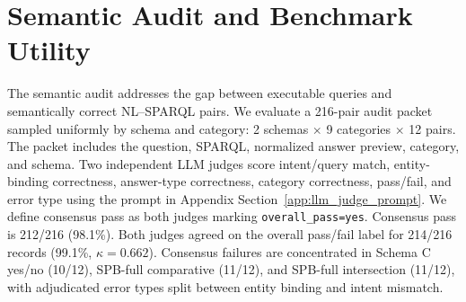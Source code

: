 \documentclass[11pt]{article}
\begin{document}
\section{Semantic Audit and Benchmark Utility}
\label{sec:audit_utility}
The semantic audit addresses the gap between executable queries and semantically correct NL--SPARQL pairs. We evaluate a 216-pair audit packet sampled uniformly by schema and category: 2 schemas \(\times\) 9 categories \(\times\) 12 pairs. The packet includes the question, SPARQL, normalized answer preview, category, and schema. Two independent LLM judges score intent/query match, entity-binding correctness, answer-type correctness, category correctness, pass/fail, and error type using the prompt in Appendix Section~\ref{app:llm_judge_prompt}. We define consensus pass as both judges marking \texttt{overall\_pass=yes}. Consensus pass is 212/216 (98.1\%). Both judges agreed on the overall pass/fail label for 214/216 records (99.1\%, \(\kappa=0.662\)). Consensus failures are concentrated in Schema C yes/no (10/12), SPB-full comparative (11/12), and SPB-full intersection (11/12), with adjudicated error types split between entity binding and intent mismatch.

\begin{table}[t]
  \centering
  \small
  \caption{Dual LLM-judge semantic audit over 216 stratified examples. Consensus requires both judges to mark the pair as semantically passing. Agreement and \(\kappa\) are computed on the overall pass/fail label; high observed agreement with moderate \(\kappa\) reflects the low number of failures.}
  \label{tab:semantic_audit}
\end{table}
\end{document}
